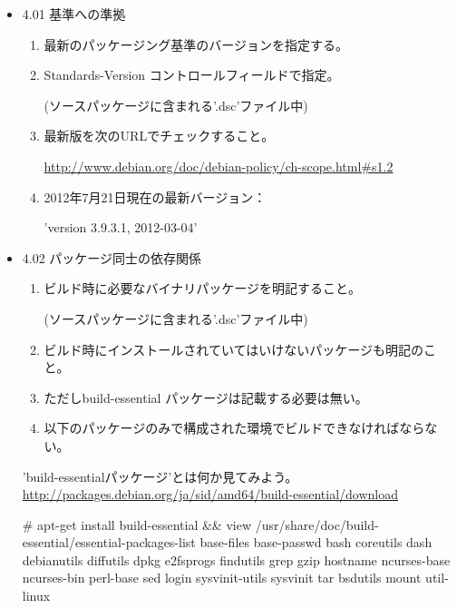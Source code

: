 \documentclass[mingoth,a4paper]{jsarticle}
\begin{document}
\begin{itemize}
\item 4.01 基準への準拠
  \begin{enumerate}
  \item 最新のパッケージング基準のバージョンを指定する。
  \item Standards-Version コントロールフィールドで指定。

    (ソースパッケージに含まれる'.dsc'ファイル中)
  \item 最新版を次のURLでチェックすること。

    \url{http://www.debian.org/doc/debian-policy/ch-scope.html#s1.2}
  \item 2012年7月21日現在の最新バージョン：

    'version 3.9.3.1, 2012-03-04'
  \end{enumerate}

\item 4.02 パッケージ同士の依存関係
  \begin{enumerate}
  \item ビルド時に必要なバイナリパッケージを明記すること。

    (ソースパッケージに含まれる'.dsc'ファイル中)
  \item ビルド時にインストールされていてはいけないパッケージも明記のこと。
  \item ただしbuild-essential パッケージは記載する必要は無い。
  \item 以下のパッケージのみで構成された環境でビルドできなければならない。
  \end{enumerate}

  \begin{itembox}[l]{'build-essentialパッケージ'とは何か見てみよう。}
    \url{http://packages.debian.org/ja/sid/amd64/build-essential/download}
    \begin{commandline}
# apt-get install build-essential && view /usr/share/doc/build-essential/essential-packages-list
  base-files base-passwd bash coreutils dash debianutils diffutils
  dpkg e2fsprogs findutils grep gzip hostname ncurses-base
  ncurses-bin perl-base sed login sysvinit-utils sysvinit
  tar bsdutils mount util-linux
    \end{commandline}
  \end{itembox}


\end{itemize}
\end{document}
